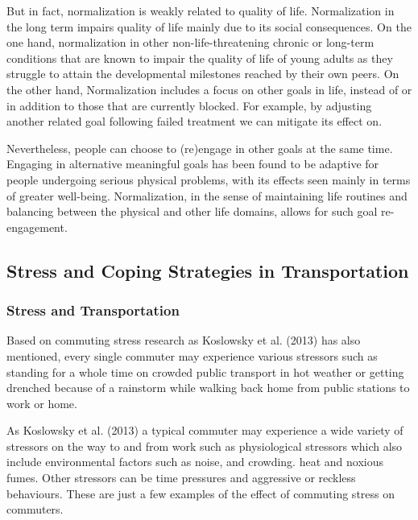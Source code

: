 \documentclass[
11pt, %
oneside, %
english, %
singlespacing, %
]{macthesis} %
\begin{document}
But in fact, normalization is weakly related to quality of life. Normalization in the long term impairs quality of life mainly due to its social consequences. On the one hand, normalization in other non-life-threatening chronic or long-term conditions that are known to impair the quality of life of young adults as they struggle to attain the developmental milestones reached by their own peers. On the other hand, Normalization includes a focus on other goals in life, instead of or in addition to those that are currently blocked. For example, by adjusting another related goal following failed treatment we can mitigate its effect on.

Nevertheless, people can choose to (re)engage in other goals at the same time. Engaging in alternative meaningful goals has been found to be adaptive for people undergoing serious physical problems, with its effects seen mainly in terms of greater well-being. Normalization, in the sense of maintaining life routines and balancing between the physical and other life domains, allows for such goal re-engagement.

\hypertarget{stress-and-coping-strategies-in-transportation}{%
\subsection{Stress and Coping Strategies in Transportation}\label{stress-and-coping-strategies-in-transportation}}

\hypertarget{stress-and-transportation-1}{%
\subsubsection{Stress and Transportation}\label{stress-and-transportation-1}}

Based on commuting stress research as Koslowsky et al. (2013) has also mentioned, every single commuter may experience various stressors such as standing for a whole time on crowded public transport in hot weather or getting drenched because of a rainstorm while walking back home from public stations to work or home.

As Koslowsky et al. (2013) a typical commuter may experience a wide variety of stressors on the way to and from work such as physiological stressors which also include environmental factors such as noise, and crowding. heat and noxious fumes. Other stressors can be time pressures and aggressive or reckless behaviours. These are just a few examples of the effect of commuting stress on commuters.
\end{document}
